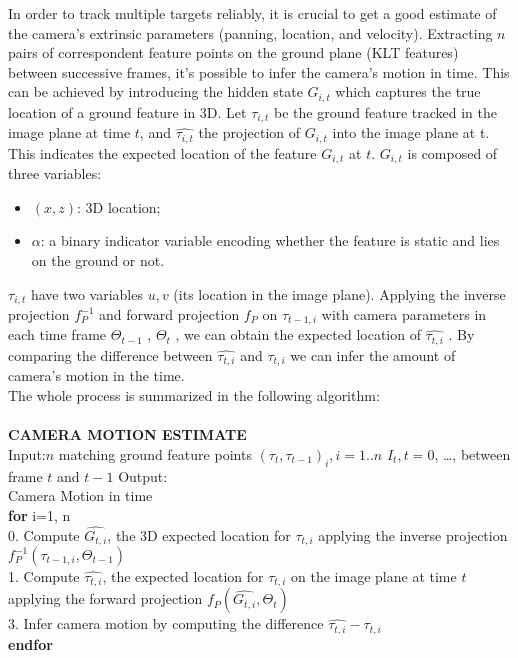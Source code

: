 In order to track multiple targets reliably, it is crucial to get a good estimate of the camera’s extrinsic parameters (panning, location, and velocity).  
Extracting $n$ pairs of correspondent feature points on the ground plane (KLT features)  between successive frames, it's possible to infer the camera's motion in time.  This can be achieved by introducing the hidden state $G_{i,t}$ which captures the true location of a ground feature in 3D.
Let $\tau_{i,t}$ be the ground feature tracked in the image plane at time $t$, and $\hat{\tau_{i,t}}$ the projection of $G_{i,t}$ into the image plane at t. This indicates the expected location of the feature $G_{i,t}$ at $t$.
$G_{i,t}$ is composed of three variables:
\begin{itemize}
\item $(x, z)$: 3D location;
\item $\alpha$: a binary indicator variable encoding whether the feature is static and lies 
on the ground or not.
\end{itemize}
$\tau_{i,t}$ have two variables $u, v$ (its location in the image plane). 
Applying the inverse projection $f_P^{-1}$ and forward projection $f_P$ on $\tau_{t-1,i}$ with camera parameters in each time frame $\Theta_{t-1}$ , $\Theta_{t}$ , we can obtain the expected location of $\hat{\tau_{t,i}}$  . By comparing the difference between $\hat{\tau_{t,i}}$ and $\tau_{t,i}$  we can infer the amount of camera’s motion in the time. \\The whole process is summarized in the following algorithm:
\\
\\
{\bf CAMERA MOTION ESTIMATE}\\[.4cm]
{\sf
Input:$n$ matching ground feature points $(\tau_{t},\tau_{t-1})_i , i=1..n$ $I_t, t=0$, \ldots, between frame $t$ and $t-1$
Output:\\ 
Camera Motion in time\\[.2cm]
{\bf for} i=1, n\\
0. \hspace*{0.2cm} Compute $\hat{G_{t,i}}$, the 3D expected location for $\tau_{t,i}$ applying the inverse projection $f_P^{-1}(\tau_{t-1,i},\Theta_{t-1})$ 
\\
1. \hspace*{0.2cm} Compute $\hat{\tau_{t,i}}$, the expected location for $\tau_{t,i}$ on the image plane at time $t$ applying the forward projection $f_P(\hat{G_{t,i}},\Theta_{t})$ 
\\
3.  \hspace*{0.2cm} Infer camera motion by computing the difference $\hat{\tau_{t,i}}-\tau_{t,i}$
\\
{\bf endfor} \\
}\\[.4cm]
\\
\\

